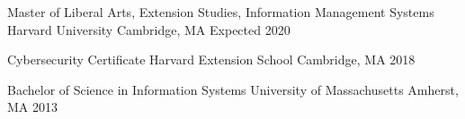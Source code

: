 
\begin{cventries}
  \cventry
    {Master of Liberal Arts, Extension Studies, Information Management Systems} %
    {Harvard University} %
    {Cambridge, MA} %
    {Expected 2020} %

  \cventry
    {Cybersecurity Certificate} %
    {Harvard Extension School} %
    {Cambridge, MA} %
    {2018} %

  \cventry
    {Bachelor of Science in Information Systems} %
    {University of Massachusetts} %
    {Amherst, MA} %
    {2013} %
    
\end{cventries}
